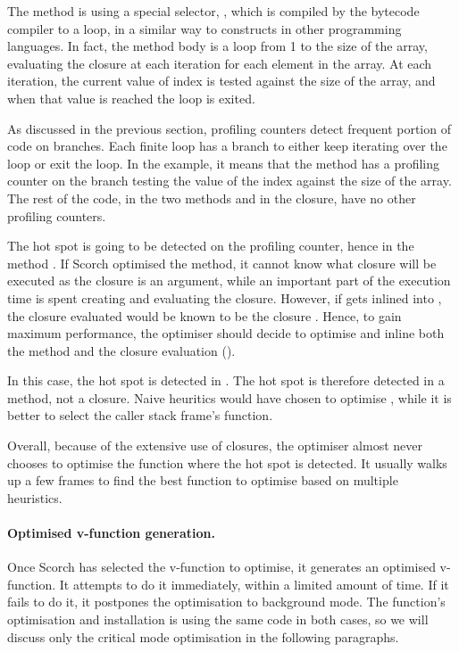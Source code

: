 \documentclass[a4paper,12pt,twoside]{../includes/ThesisStyle}
\begin{document}
The method  is using a special selector, , which is compiled by the bytecode compiler to a loop, in a similar way to  constructs in other programming languages. In fact, the  method body is a loop from 1 to the size of the array, evaluating the closure at each iteration for each element in the array. At each iteration, the current value of index is tested against the size of the array, and when that value is reached the loop is exited.

As discussed in the previous section, profiling counters detect frequent portion of code on branches. Each finite loop has a branch to either keep iterating over the loop or exit the loop. In the example, it means that the method  has a profiling counter on the branch testing the value of the index against the size of the array. The rest of the code, in the two methods and in the closure, have no other profiling counters.

The hot spot is going to be detected on the profiling counter, hence in the method . If Scorch optimised the  method, it cannot know what closure will be executed as the closure is an argument, while an important part of the execution time is spent creating and evaluating the closure. However, if  gets inlined into , the closure evaluated would be known to be the closure . Hence, to gain maximum performance, the optimiser should decide to optimise  and inline both the  method and the closure evaluation (). 

In this case, the hot spot is detected in . The hot spot is therefore detected in a method, not a closure. Naive heuritics would have chosen to optimise , while it is better to select the caller stack frame's function.

Overall, because of the extensive use of closures, the optimiser almost never chooses to optimise the function where the hot spot is detected. It usually walks up a few frames to find the best function to optimise based on multiple heuristics. 

\paragraph{Optimised v-function generation.}
Once Scorch has selected the v-function to optimise, it generates an optimised v-function. It attempts to do it immediately, within a limited amount of time. If it fails to do it, it postpones the optimisation to background mode. The function's optimisation and installation is using the same code in both cases, so we will discuss only the critical mode optimisation in the following paragraphs.
\end{document}
